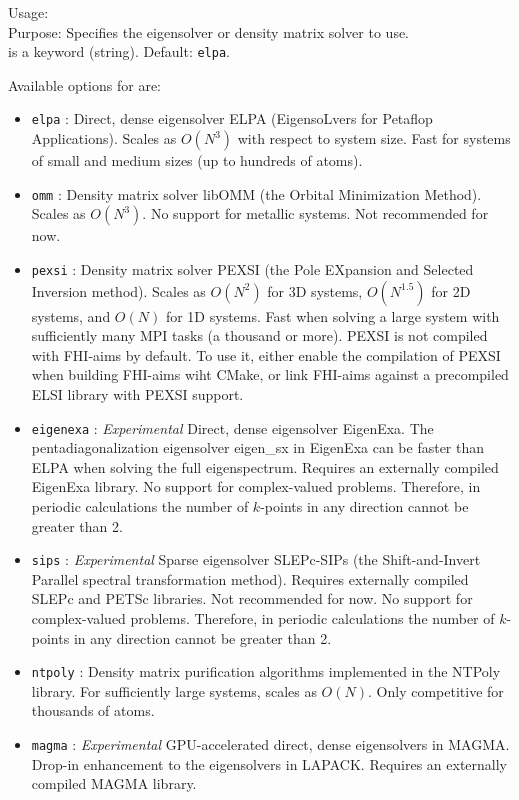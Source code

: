 {
  \noindent
  Usage:   \\[1.0ex]
  Purpose: Specifies the eigensolver or density matrix solver to use. \\[1.0ex]
   is a keyword (string). Default: \texttt{elpa}. \\
}

Available options for  are:
\begin{itemize}
  \item \texttt{elpa} : Direct, dense eigensolver ELPA (EigensoLvers for
    Petaflop Applications). Scales as $O(N^3)$ with respect to system size.
    Fast for systems of small and medium sizes (up to hundreds of atoms).
  \item \texttt{omm} : Density matrix solver libOMM (the Orbital Minimization
    Method). Scales as $O(N^3)$. No support for metallic systems. Not
    recommended for now.
  \item \texttt{pexsi} : Density matrix solver PEXSI (the Pole EXpansion and
    Selected Inversion method). Scales as $O(N^2)$ for 3D systems, $O(N^{1.5})$
    for 2D systems, and $O(N)$ for 1D systems. Fast when solving a large system
    with sufficiently many MPI tasks (a thousand or more). PEXSI is not compiled
    with FHI-aims by default. To use it, either enable the compilation of PEXSI
    when building FHI-aims wiht CMake, or link FHI-aims against a precompiled
    ELSI library with PEXSI support.
  \item \texttt{eigenexa} : \emph{Experimental} Direct, dense eigensolver
    EigenExa. The pentadiagonalization eigensolver eigen\_sx in EigenExa can be
    faster than ELPA when solving the full eigenspectrum. Requires an externally
    compiled EigenExa library. No support for complex-valued problems.
    Therefore, in periodic calculations the number of $k$-points in any
    direction cannot be greater than 2.
  \item \texttt{sips} : \emph{Experimental} Sparse eigensolver SLEPc-SIPs (the
    Shift-and-Invert Parallel spectral transformation method). Requires
    externally compiled SLEPc and PETSc libraries. Not recommended for now. No
    support for complex-valued problems. Therefore, in periodic calculations the
    number of $k$-points in any direction cannot be greater than 2.
  \item \texttt{ntpoly} : Density matrix purification algorithms implemented in
    the NTPoly library. For sufficiently large systems, scales as $O(N)$. Only
    competitive for thousands of atoms.
  \item \texttt{magma} : \emph{Experimental} GPU-accelerated direct, dense
    eigensolvers in MAGMA. Drop-in enhancement to the eigensolvers in LAPACK.
    Requires an externally compiled MAGMA library.
\end{itemize}

